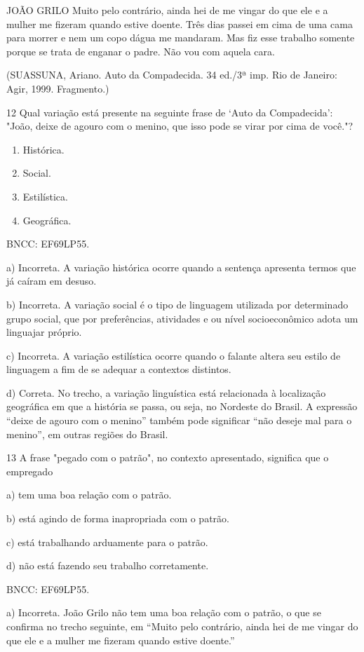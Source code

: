 JOÃO GRILO Muito pelo contrário, ainda hei de me vingar do que ele e a
mulher me fizeram quando estive doente. Três dias passei em cima de uma
cama para morrer e nem um copo dágua me mandaram. Mas fiz esse trabalho
somente porque se trata de enganar o padre. Não vou com aquela cara.

(SUASSUNA, Ariano. Auto da Compadecida. 34 ed./3ª imp. Rio de Janeiro:
Agir, 1999. Fragmento.)

\num{12} Qual variação está presente na seguinte frase de `Auto da
Compadecida': "João, deixe de agouro com o menino, que isso pode se
virar por cima de você."?

\begin{enumerate}
\def\labelenumi{\alph{enumi})}
\item
  Histórica.
\item
  Social.
\item
  Estilística.
\item
  Geográfica.
\end{enumerate}

BNCC: EF69LP55.

a) Incorreta. A variação histórica ocorre quando a sentença apresenta
termos que já caíram em desuso.

b) Incorreta. A variação social é o tipo de linguagem utilizada por
determinado grupo social, que por preferências, atividades e ou nível
socioeconômico adota um linguajar próprio.

c) Incorreta. A variação estilística ocorre quando o falante altera seu
estilo de linguagem a fim de se adequar a contextos distintos.

d) Correta. No trecho, a variação linguística está relacionada à
localização geográfica em que a história se passa, ou seja, no Nordeste
do Brasil. A expressão ``deixe de agouro com o menino'' também pode
significar ``não deseje mal para o menino'', em outras regiões do
Brasil.

\num{13} A frase "pegado com o patrão", no contexto apresentado,
significa que o empregado

a) tem uma boa relação com o patrão.

b) está agindo de forma inapropriada com o patrão.

c) está trabalhando arduamente para o patrão.

d) não está fazendo seu trabalho corretamente.

BNCC: EF69LP55.

a) Incorreta. João Grilo não tem uma boa relação com o patrão, o que se
confirma no trecho seguinte, em ``Muito pelo contrário, ainda hei de me
vingar do que ele e a mulher me fizeram quando estive doente.''

